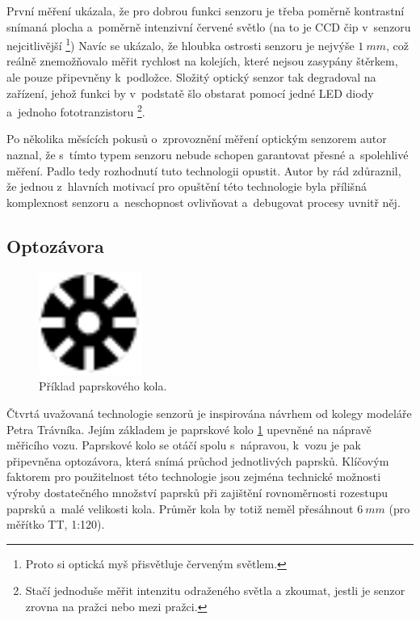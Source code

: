 První měření ukázala, že pro dobrou funkci senzoru je třeba poměrně kontrastní
snímaná plocha a~poměrně intenzivní červené světlo (na to je CCD čip v~senzoru
nejcitlivější \footnote{Proto si optická myš přisvětluje červeným světlem.})
Navíc se ukázalo, že hloubka ostrosti senzoru je nejvýše $1\ mm$, což reálně
znemožňovalo měřit rychlost na kolejích, které nejsou zasypány štěrkem, ale
pouze připevněny k~podložce. Složitý optický senzor tak degradoval na zařízení,
jehož funkci by v~podstatě šlo obstarat pomocí jedné LED diody a~jednoho
fototranzistoru \footnote{Stačí jednoduše měřit intenzitu odraženého světla a
zkoumat, jestli je senzor zrovna na pražci nebo mezi pražci.}.

Po několika měsících pokusů o~zprovoznění měření optickým senzorem autor naznal,
že s~tímto typem senzoru nebude schopen garantovat přesné a~spolehlivé měření.
Padlo tedy rozhodnutí tuto technologii opustit. Autor by rád zdůraznil, že
jednou z~hlavních motivací pro opuštění této technologie byla přílišná
komplexnost senzoru a~neschopnost ovlivňovat a~debugovat procesy uvnitř něj.

\subsection{Optozávora}
\label{subsec:wsm-senzor-optozavora}

\begin{figure}[h]
\includegraphics[width=0.3\textwidth]{data/clonka.pdf}
\caption{Příklad paprskového kola.}
\label{fig:wheel}
\end{figure}

Čtvrtá uvažovaná technologie senzorů je inspirována návrhem od kolegy modeláře
Petra Trávníka. Jejím základem je paprskové kolo \ref{fig:wheel}
upevněné na nápravě měřicího vozu. Paprskové kolo se otáčí spolu s~nápravou,
k~vozu je pak připevněna optozávora, která snímá průchod jednotlivých paprsků.
Klíčovým faktorem pro použitelnost této technologie jsou zejména technické
možnosti výroby dostatečného množství paprsků při zajištění rovnoměrnosti
rozestupu paprsků a~malé velikosti kola. Průměr kola by totiž neměl přesáhnout
$6\ mm$ (pro měřítko TT, 1:120).

